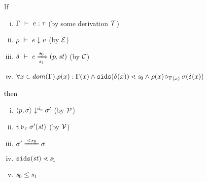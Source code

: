 \begin{thm}
	If 
	\begin{enumerate}[(i)]
		\item $\Type{\Gam}{e}{\tau}$ (by some derivation $\MT$)
		\item $\Eval{\rho}{e}{v}$ (by $\ME$) 
		\item $\Trans{\del}{e}{\s_0}{\s_1}{\sfun{p}{\st}}$ (by $\MC$)
		\item $\forall x \in dom(\Gam).\rho(x):\Gam(x) \wedge \sids{\del(x)} \SetLe \s_0  \wedge  \ValRep{\rho(x)}{\Gam(x)}{\sgm(\del(x))}$
	\end{enumerate}
	then 
	\begin{enumerate}[(i)]
		\item $\seval{p}{\sgm}{\a_c}{\sgm'}$ (by $\MP$)
		\item  $\ValRep{v}{\tau}{\sgm'(\st)}$ (by $\MV$)
		\item $\sgm' \ConEq{s_0} \sgm $
		\item  $\sids{\st} \SetLe \s_1$
		\item $\s_0 \le \s_1$
	\end{enumerate} 
\end{thm}

